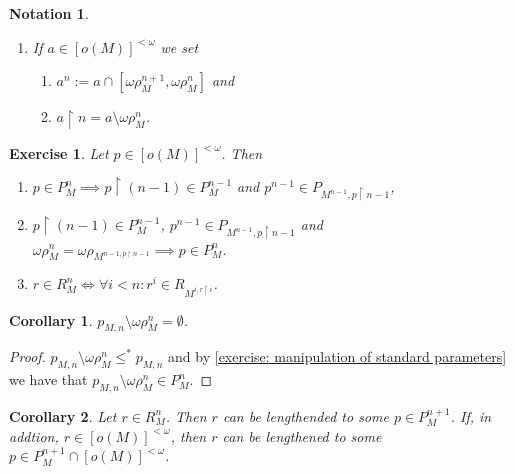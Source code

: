 \documentclass[12pt,a4paper]{article}
\theoremstyle{nicestyle}
\newtheorem{exercise}{Exercise}[subsection]
\newtheorem{corollary}{Corollary}[subsection]
\newtheorem{notation}{Notation}[subsection]
\begin{document}
    \begin{notation}
    \begin{enumerate}
    \item If $a \in [o(M)]^{< \omega}$ we set
      \begin{enumerate}
      \item $a^{n} := a \cap [ \omega\rho^{n+1}_{M}, \omega\rho^{n}_{M}]$ and
      \item $a \restriction n = a \setminus \omega\rho^{n}_{M}$.
      \end{enumerate}
    \end{enumerate}
  \end{notation}
  
  \begin{exercise} \label{exercise: manipulation of standard parameters}
    Let $p \in [o(M)]^{<\omega}$. Then
    \begin{enumerate}
    \item
      $p \in P^{n}_{M} \implies p \restriction (n-1) \in P^{n-1}_{M}$
      and $p^{n-1} \in P_{M^{n-1}, p \restriction n-1}$,
    \item $p \restriction (n-1) \in P^{n-1}_{M}$,
      $p^{n-1} \in P_{M^{n-1}, p \restriction n-1}$ and
      $\omega\rho^{n}_{M} = \omega\rho_{M^{n-1, p \restriction n -1}}
      \implies p \in P^{n}_{M}$.
    \item
      $r \in R^{n}_{M} \iff \forall i < n \colon r^{i} \in R_{M^{i, r
          \restriction i}}$.
    \end{enumerate}

  \end{exercise}

  \begin{corollary}
    $p_{M,n} \setminus \omega\rho^{n}_{M} = \emptyset$.
  \end{corollary}

  \begin{proof}
    $p_{M,n} \setminus \omega\rho^{n}_{M} \le^{*} p_{M,n}$ and by
    \autoref{exercise: manipulation of standard parameters} we have
    that $p_{M,n} \setminus \omega\rho^{n}_{M} \in P^{n}_{M}$.
  \end{proof}

  \begin{corollary} \label{corollary: lengthening standard parameters}
    Let $r \in R^{n}_{M}$. Then $r$ can be lengthended to some
    $p \in P^{n+1}_{M}$. If, in addtion, $r \in [o(M)]^{< \omega}$,
    then $r$ can be lengthened to some
    $p \in P^{n+1}_{M} \cap [o(M)]^{<\omega}$.
  \end{corollary}
\end{document}
